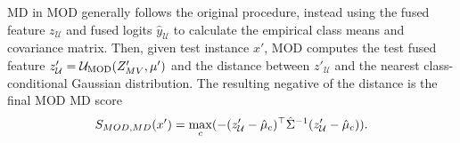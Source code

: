 MD in MOD generally follows the original procedure, instead using the fused feature $z_{\mathcal{U}}$ and fused logits $\hat{y}_{\mathcal{U}}$ to calculate the empirical class means and covariance matrix. Then, given test instance $x'$, MOD computes the test fused feature $z'_{\mathcal{U}} = \mathcal{U}_{\text{MOD}}(Z'_{MV}, \mu')$ and the distance between $z'_{\mathcal{U}}$ and the nearest class-conditional Gaussian distribution. The resulting negative of the distance is the final MOD MD score
\begin{equation}
\begin{aligned}
     S_{MOD,MD}(x') = \max_{c} (-(z_{\mathcal{U}}' - \hat{\mu}_{c})^\top \hat{\Sigma}^{-1} (z_{\mathcal{U}}' - \hat{\mu}_{c})). \\
\end{aligned}
\end{equation}


